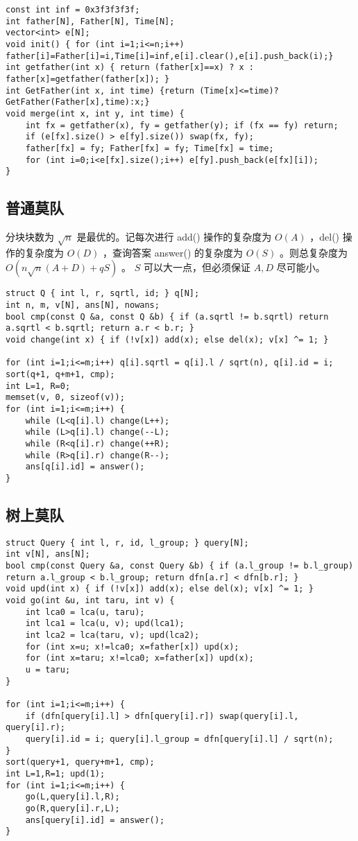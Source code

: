 \documentclass[landscape,a4paper]{article}
\begin{document}
\begin{lstlisting}
const int inf = 0x3f3f3f3f;
int father[N], Father[N], Time[N];
vector<int> e[N];
void init() { for (int i=1;i<=n;i++) father[i]=Father[i]=i,Time[i]=inf,e[i].clear(),e[i].push_back(i);}
int getfather(int x) { return (father[x]==x) ? x : father[x]=getfather(father[x]); }
int GetFather(int x, int time) {return (Time[x]<=time)?GetFather(Father[x],time):x;}
void merge(int x, int y, int time) {
	int fx = getfather(x), fy = getfather(y); if (fx == fy) return;
	if (e[fx].size() > e[fy].size()) swap(fx, fy);
	father[fx] = fy; Father[fx] = fy; Time[fx] = time;
	for (int i=0;i<e[fx].size();i++) e[fy].push_back(e[fx][i]);
}
\end{lstlisting}

\subsection{普通莫队}

分块块数为 $\sqrt{n}$ 是最优的。记每次进行 add() 操作的复杂度为 $O(A)$ ，del() 操作的复杂度为 $O(D)$ ，查询答案 answer() 的复杂度为 $O(S)$ 。则总复杂度为 $O(n \sqrt{n} (A + D) + qS)$ 。 $S$ 可以大一点，但必须保证 $A, D$ 尽可能小。

\begin{lstlisting}
struct Q { int l, r, sqrtl, id; } q[N];
int n, m, v[N], ans[N], nowans;
bool cmp(const Q &a, const Q &b) { if (a.sqrtl != b.sqrtl) return a.sqrtl < b.sqrtl; return a.r < b.r; }
void change(int x) { if (!v[x]) add(x); else del(x); v[x] ^= 1; }

for (int i=1;i<=m;i++) q[i].sqrtl = q[i].l / sqrt(n), q[i].id = i;
sort(q+1, q+m+1, cmp);
int L=1, R=0;
memset(v, 0, sizeof(v));
for (int i=1;i<=m;i++) {
	while (L<q[i].l) change(L++);
	while (L>q[i].l) change(--L);
	while (R<q[i].r) change(++R);
	while (R>q[i].r) change(R--);
	ans[q[i].id] = answer();
}
\end{lstlisting}
\subsection{树上莫队}

\begin{lstlisting}
struct Query { int l, r, id, l_group; } query[N];
int v[N], ans[N];
bool cmp(const Query &a, const Query &b) { if (a.l_group != b.l_group) return a.l_group < b.l_group; return dfn[a.r] < dfn[b.r]; }
void upd(int x) { if (!v[x]) add(x); else del(x); v[x] ^= 1; }
void go(int &u, int taru, int v) {
	int lca0 = lca(u, taru);
	int lca1 = lca(u, v); upd(lca1);
	int lca2 = lca(taru, v); upd(lca2);
	for (int x=u; x!=lca0; x=father[x]) upd(x);
	for (int x=taru; x!=lca0; x=father[x]) upd(x);
	u = taru;
}

for (int i=1;i<=m;i++) {
	if (dfn[query[i].l] > dfn[query[i].r]) swap(query[i].l, query[i].r);
	query[i].id = i; query[i].l_group = dfn[query[i].l] / sqrt(n);
}
sort(query+1, query+m+1, cmp);
int L=1,R=1; upd(1);
for (int i=1;i<=m;i++) {
	go(L,query[i].l,R);
	go(R,query[i].r,L);
	ans[query[i].id] = answer();
}
\end{lstlisting}
\end{document}
